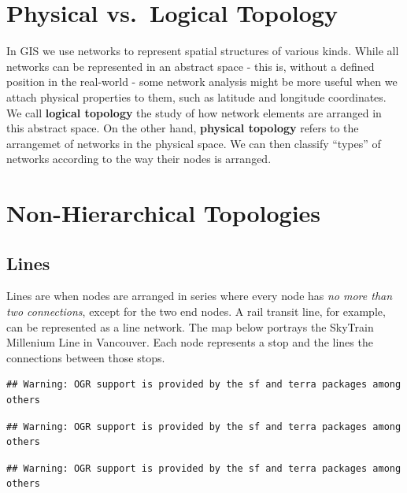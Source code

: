 \documentclass[
]{book}
\begin{document}
\hypertarget{physical-vs.-logical-topology}{%
\section{Physical vs.~Logical Topology}\label{physical-vs.-logical-topology}}

In GIS we use networks to represent spatial structures of various kinds. While all networks can be represented in an abstract space - this is, without a defined position in the real-world - some network analysis might be more useful when we attach physical properties to them, such as latitude and longitude coordinates. We call \textbf{logical topology} the study of how network elements are arranged in this abstract space. On the other hand, \textbf{physical topology} refers to the arrangemet of networks in the physical space. We can then classify ``types'' of networks according to the way their nodes is arranged.

\hypertarget{non-hierarchical-topologies}{%
\section{Non-Hierarchical Topologies}\label{non-hierarchical-topologies}}

\hypertarget{lines}{%
\subsection{Lines}\label{lines}}

Lines are when nodes are arranged in series where every node has \emph{no more than two connections}, except for the two end nodes. A rail transit line, for example, can be represented as a line network. The map below portrays the SkyTrain Millenium Line in Vancouver. Each node represents a stop and the lines the connections between those stops.

\begin{verbatim}
## Warning: OGR support is provided by the sf and terra packages among others
\end{verbatim}

\begin{verbatim}
## Warning: OGR support is provided by the sf and terra packages among others
\end{verbatim}

\begin{verbatim}
## Warning: OGR support is provided by the sf and terra packages among others
\end{verbatim}
\end{document}
